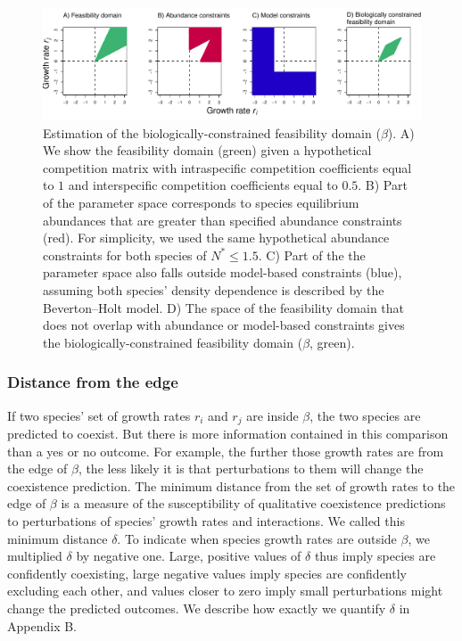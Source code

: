 \begin{refsection}
\begin{figure}[H]
  \centerline{\includegraphics[width=1\textwidth]{figures/chapter3_fig1.pdf}}
  \caption[Estimation of the biologically-constrained feasibility domain]{Estimation of the biologically-constrained feasibility domain ($\beta$). A) We show the feasibility domain (green) given a hypothetical competition matrix with intraspecific competition coefficients equal to $1$ and interspecific competition coefficients equal to $0.5$. B) Part of the parameter space corresponds to species equilibrium abundances that are greater than specified abundance constraints (red). For simplicity, we used the same hypothetical abundance constraints for both species of $N^* \le 1.5$. C) Part of the the parameter space also falls outside model-based constraints (blue), assuming both species' density dependence is described by the Beverton--Holt model. D) The space of the feasibility domain that does not overlap with abundance or model-based constraints gives the biologically-constrained feasibility domain ($\beta$, green). }
  \label{fig:domain}
\end{figure}


\subsubsection*{Distance from the edge}

If two species' set of growth rates $r_{i}$ and $r_{j}$ are inside $\beta$, the two species are predicted to coexist. But there is more information contained in this comparison than a yes or no outcome. For example, the further those growth rates are from the edge of $\beta$, the less likely it is that perturbations to them will change the coexistence prediction. The minimum distance from the set of growth rates to the edge of $\beta$ is a measure of the susceptibility of qualitative coexistence predictions to perturbations of species' growth rates and interactions. We called this minimum distance $\delta$. To indicate when species growth rates are outside $\beta$, we multiplied $\delta$ by negative one. Large, positive values of $\delta$  thus imply species are confidently coexisting, large negative values imply species are confidently excluding each other, and values closer to zero imply small perturbations might change the predicted outcomes. We describe how exactly we quantify $\delta$ in Appendix B.



\end{refsection}
